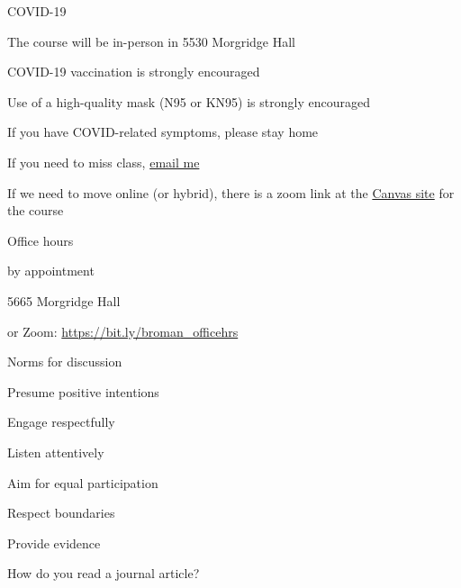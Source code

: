 \documentclass[aspectratio=169,12pt,t]{beamer}
\begin{document}
\begin{frame}{COVID-19}

  \bbi
\item The course will be in-person in 5530 Morgridge Hall
\item COVID-19 vaccination is strongly encouraged
\item Use of a high-quality mask (N95 or KN95) is strongly encouraged
\item If you have COVID-related symptoms, please stay home
\item If you need to miss class, \href{mailto:broman@wisc.edu}{email me}
\item If we need to move online (or hybrid), there is a zoom link at
  the \href{https://canvas.wisc.edu/courses/529564}{Canvas site} for the course
  \ei

\end{frame}




\begin{frame}{Office hours}

  \bbi
\item {\hilit by appointment}
\item 5665 Morgridge Hall
\item or Zoom: \url{https://bit.ly/broman_officehrs}
\ei

\end{frame}






\begin{frame}{Norms for discussion}

      \bbi
    \item Presume positive intentions
    \item Engage respectfully
    \item Listen attentively
    \item Aim for equal participation
    \item Respect boundaries
    \item Provide evidence
      \ei

\end{frame}




\begin{frame}[c]{}

\centerline{\Large \color{title} How do you read a journal article?}

\end{frame}
\end{document}
